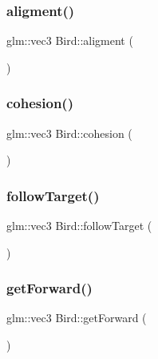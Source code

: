 \subsubsection{\texorpdfstring{aligment()}{aligment()}}
{\footnotesize\ttfamily glm\+::vec3 Bird\+::aligment (\begin{DoxyParamCaption}{ }\end{DoxyParamCaption})}

\mbox{\label{classBird_ae30d88996b92134ab8acb4105766a5cb}} 
\subsubsection{\texorpdfstring{cohesion()}{cohesion()}}
{\footnotesize\ttfamily glm\+::vec3 Bird\+::cohesion (\begin{DoxyParamCaption}{ }\end{DoxyParamCaption})}

\mbox{\label{classBird_a6383559729a95495285d246f910fe37e}} 
\subsubsection{\texorpdfstring{follow\+Target()}{followTarget()}}
{\footnotesize\ttfamily glm\+::vec3 Bird\+::follow\+Target (\begin{DoxyParamCaption}{ }\end{DoxyParamCaption})}

\mbox{\label{classBird_ad212b0b56ce7a244c02c78811fcc7a7c}} 
\subsubsection{\texorpdfstring{get\+Forward()}{getForward()}}
{\footnotesize\ttfamily glm\+::vec3 Bird\+::get\+Forward (\begin{DoxyParamCaption}{ }\end{DoxyParamCaption})}

\mbox{\label{classBird_a4611f1cf5c173562bb4c14fe719f20fa}} 
